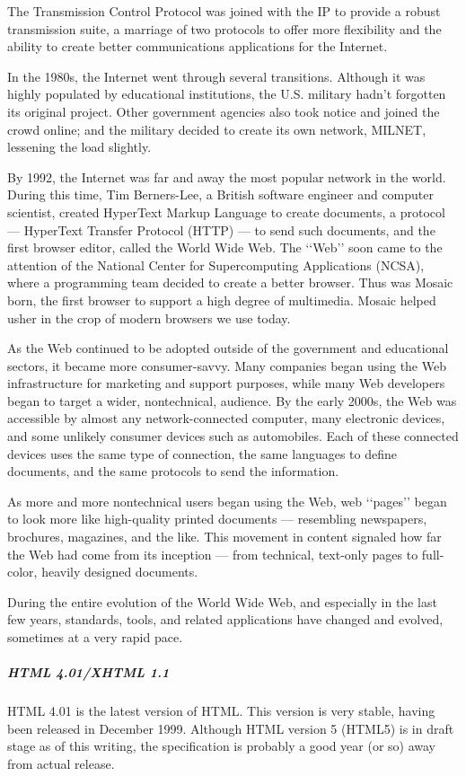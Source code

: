 The Transmission Control Protocol was joined with the IP to provide a robust transmission suite,
a marriage of two protocols to offer more flexibility and the ability to create better communications
applications for the Internet.

In the 1980s, the Internet went through several transitions. Although it was highly populated by
educational institutions, the U.S. military hadn’t forgotten its original project. Other government
agencies also took notice and joined the crowd online; and the military decided to create its own
network, MILNET, lessening the load slightly.

By 1992, the Internet was far and away the most popular network in the world. During this
time, Tim Berners-Lee, a British software engineer and computer scientist, created HyperText
Markup Language to create documents, a protocol — HyperText Transfer Protocol (HTTP) — to send such documents, and the first browser editor, called the World Wide Web. The ‘‘Web’’ soon
came to the attention of the National Center for Supercomputing Applications (NCSA), where a
programming team decided to create a better browser. Thus was Mosaic born, the first browser
to support a high degree of multimedia. Mosaic helped usher in the crop of modern browsers we
use today.

As the Web continued to be adopted outside of the government and educational sectors, it
became more consumer-savvy. Many companies began using the Web infrastructure for marketing
and support purposes, while many Web developers began to target a wider, nontechnical,
audience.
By the early 2000s, the Web was accessible by almost any network-connected computer, many
electronic devices, and some unlikely consumer devices such as automobiles. Each of these connected
devices uses the same type of connection, the same languages to define documents, and
the same protocols to send the information.

As more and more nontechnical users began using the Web, web ‘‘pages’’ began to look more
like high-quality printed documents — resembling newspapers, brochures, magazines, and the
like. This movement in content signaled how far the Web had come from its inception — from
technical, text-only pages to full-color, heavily designed documents.

During the entire evolution of the World Wide Web, and especially in the last few years, standards,
tools, and related applications have changed and evolved, sometimes at a very rapid pace.
\subparagraph*{HTML 4.01/XHTML 1.1}
\hfill \break
HTML 4.01 is the latest version of HTML. This version is very stable, having been released in
December 1999. Although HTML version 5 (HTML5) is in draft stage as of this writing, the
specification is probably a good year (or so) away from actual release.

